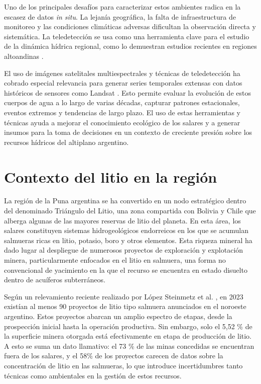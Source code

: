 Uno de los principales desafíos para caracterizar estos ambientes radica en la escasez de datos \textit{in situ}. La lejanía geográfica, la falta de infraestructura de monitoreo y las condiciones climáticas adversas dificultan la observación directa y sistemática. La teledetección se usa como una herramienta clave para el estudio de la dinámica hídrica regional, como lo demuestran estudios recientes en regiones altoandinas \cite{saavedra2018changes}.



El uso de imágenes satelitales multiespectrales y técnicas de teledetección ha cobrado especial relevancia para generar series temporales extensas con datos históricos de sensores como  Landsat \cite{wulder2019landsat}. Esto permite evaluar la evolución de estos cuerpos de agua a lo largo de varias décadas, capturar patrones estacionales, eventos extremos y tendencias de largo plazo. El uso de estas herramientas y técnicas ayuda a mejorar el conocimiento ecológico de los salares y a generar insumos para la toma de decisiones en un contexto de creciente presión sobre los recursos hídricos del altiplano argentino.


\section{Contexto del litio en la región}
La región de la Puna argentina se ha convertido en un nodo estratégico dentro del denominado Triángulo del Litio, una zona compartida con Bolivia y Chile que alberga algunas de las mayores reservas de litio del planeta. En esta área, los salares constituyen sistemas hidrogeológicos endorreicos en los que se acumulan salmueras ricas en litio, potasio, boro y otros elementos. Esta riqueza mineral ha dado lugar al despliegue de numerosos proyectos de exploración y explotación minera, particularmente enfocados en el litio en salmuera, una forma no convencional de yacimiento en la que el recurso se encuentra en estado disuelto dentro de acuíferos subterráneos.

Según un relevamiento reciente realizado por López Steinmetz et al. \cite{lopezsteinmetz2024book}, en 2023 existían al menos 90 proyectos de litio tipo salmuera anunciados en el noroeste argentino. Estos proyectos abarcan un amplio espectro de etapas, desde la prospección inicial hasta la operación productiva. Sin embargo, solo el 5,52 \% de la superficie minera otorgada está efectivamente en etapa de producción de litio. A esto se suma un dato llamativo: el 73 \% de las minas concedidas se encuentran fuera de los salares, y el 58\% de los proyectos carecen de datos sobre la concentración de litio en las salmueras, lo que introduce incertidumbres tanto técnicas como ambientales en la gestión de estos recursos.

